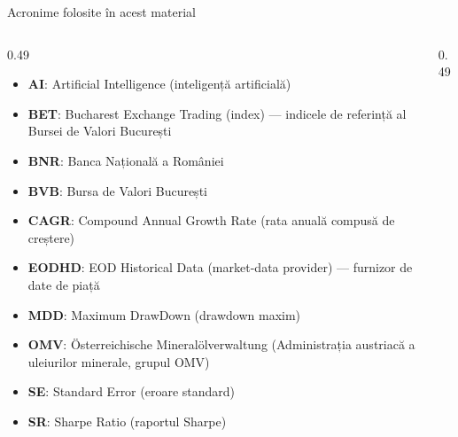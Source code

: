 {
\begin{frame}[noframenumbering]
    \titlepage
\end{frame}
}
\begin{frame}{Acronime folosite în acest material}
\begin{columns}[T]
\begin{column}{0.49\textwidth}
\begin{itemize}\setlength{\itemsep}{0pt}
    \item \textbf{AI}: Artificial Intelligence (inteligență artificială)
    \item \textbf{BET}: Bucharest Exchange Trading (index) — indicele de referință al Bursei de Valori București
    \item \textbf{BNR}: Banca Națională a României
    \item \textbf{BVB}: Bursa de Valori București
    \item \textbf{CAGR}: Compound Annual Growth Rate (rata anuală compusă de creștere)
    \item \textbf{EODHD}: EOD Historical Data (market-data provider) — furnizor de date de piață
    \item \textbf{MDD}: Maximum DrawDown (drawdown maxim)
    \item \textbf{OMV}: Österreichische Mineralölverwaltung (Administrația austriacă a uleiurilor minerale, grupul OMV)
    \item \textbf{SE}: Standard Error (eroare standard)
    \item \textbf{SR}: Sharpe Ratio (raportul Sharpe)
\end{itemize}
\end{column}
\begin{column}{0.49\textwidth}
\end{column}
\end{columns}
\end{frame}

